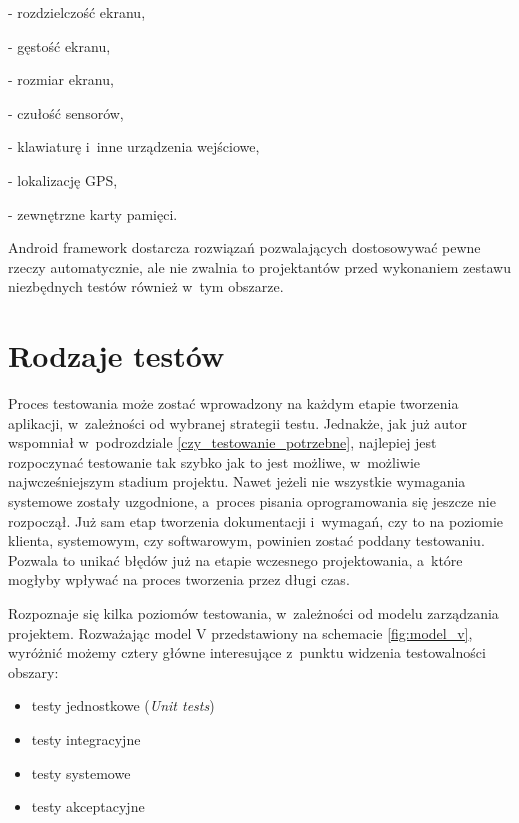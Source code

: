 \begin{itemize}
- rozdzielczość ekranu,

- gęstość ekranu,

- rozmiar ekranu,

- czułość sensorów,

- klawiaturę i~inne urządzenia wejściowe,

- lokalizację GPS,

- zewnętrzne karty pamięci.

Android framework dostarcza rozwiązań pozwalających dostosowywać pewne rzeczy automatycznie, ale nie zwalnia to projektantów przed wykonaniem zestawu niezbędnych testów również w~tym obszarze.

\end{itemize}

\section{Rodzaje testów}
Proces testowania może zostać wprowadzony na każdym etapie tworzenia aplikacji, w~zależności od wybranej strategii testu. Jednakże, jak już autor wspomniał w~podrozdziale \ref{czy_testowanie_potrzebne}, najlepiej jest rozpoczynać testowanie tak szybko jak to jest możliwe, w~możliwie najwcześniejszym stadium projektu. Nawet jeżeli nie wszystkie wymagania systemowe zostały uzgodnione, a~proces pisania oprogramowania się jeszcze nie rozpoczął. Już sam etap tworzenia dokumentacji i~wymagań, czy to na poziomie klienta, systemowym, czy softwarowym, powinien zostać poddany testowaniu. Pozwala to unikać błędów już na etapie wczesnego projektowania, a~które mogłyby wpływać na proces tworzenia przez długi czas.

Rozpoznaje się kilka poziomów testowania, w~zależności od modelu zarządzania projektem. Rozważając model V przedstawiony na schemacie \ref{fig:model_v}, wyróżnić możemy cztery główne interesujące z~punktu widzenia testowalności obszary:

\begin{itemize}
\item
testy jednostkowe (\textit{Unit tests})
\item
testy integracyjne
\item
testy systemowe
\item
testy akceptacyjne

\end{itemize}

